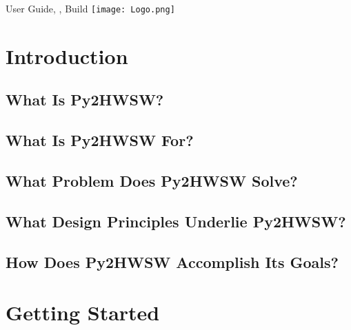 \documentclass{ug}
\date{\today}
\begin{document}
\maketitle
{}

\vspace*{\fill}
User Guide, , Build 
\hspace*{\fill} \texttt{[image: Logo.png]}

\cleardoublepage
{}
\setcounter{page}{1}

\cleardoublepage
\tableofcontents
\clearpage
\listoftables
\clearpage
\listoffigures
\cleardoublepage
{}
\setcounter{page}{1}

%
%
\section{Introduction}
\label{sec:intro}

%

\subsection{What Is Py2HWSW?}
\label{sec:whatispy2}


\subsection{What Is Py2HWSW For?}
\label{sec:purpose}


\subsection{What Problem Does Py2HWSW Solve?}
\label{sec:problem}


\subsection{What Design Principles Underlie Py2HWSW?}
\label{sec:principles}


\subsection{How Does Py2HWSW Accomplish Its Goals?}
\label{sec:how}


%
%
\ifdefined\SECTIONCLEARPAGE
\clearpage
\fi
\section{Getting Started}
\label{sec:gs}
\end{document}
